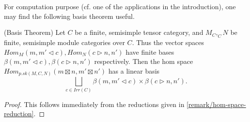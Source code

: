 \noindent For computation purpose (cf. one of the applications in the introduction), one
may find the following basis theorem useful.

\begin{proposition} (Basis Theorem) \label{proposition/basis-theorem}
  \noindent Let $C$ be a finite, semisimple tensor category, and
  $M_{C}, _{C}N$ be finite, semisimple module categories over $C$. \quad Thus
  the vector spaces $Hom_{M}(m, m' \lhd c), Hom_{N}(c \rhd n, n')$ have finite bases
  $\beta(m, m' \lhd c), \beta(c \rhd n, n')$ respectively. \quad Then the hom space
  $Hom_{p.sk(M,C,N)}(m \boxtimes n, m' \boxtimes n')$ has a linear basis
  \[
    \bigsqcup_{c \in Irr(C)} \beta(m, m' \lhd c) \times \beta(c \rhd n, n').
  \]
\end{proposition}
\begin{proof}
  This follows immediately from the reductions given in \ref{remark/hom-space-reduction}.
\end{proof}

